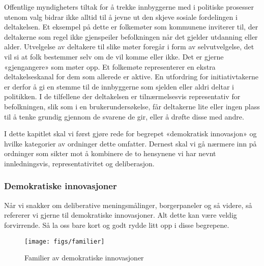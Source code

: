 \documentclass[
  12pt,
  a4paper, 12pt]{article}
\begin{document}
Offentlige myndigheters tiltak for å trekke innbyggerne med i politiske prosesser utenom valg bidrar ikke alltid til å jevne ut den skjeve sosiale fordelingen i deltakelsen. Et eksempel på dette er folkemøter som kommunene inviterer til, der deltakerne som regel ikke gjenspeiler befolkningen når det gjelder utdanning eller alder. Utvelgelse av deltakere til slike møter foregår i form av selvutvelgelse, det vil si at folk bestemmer selv om de vil komme eller ikke. Det er gjerne «gjengangere» som møter opp. Et folkemøte representerer en ekstra deltakelseskanal for dem som allerede er aktive. En utfordring for initiativtakerne er derfor å gi en stemme til de innbyggerne som sjelden eller aldri deltar i politikken. I de tilfellene der deltakelsen er tilnærmelsesvis representativ for befolkningen, slik som i en brukerundersøkelse, får deltakerne lite eller ingen plass til å tenke grundig gjennom de svarene de gir, eller å drøfte disse med andre.

I dette kapitlet skal vi først gjøre rede for begrepet «demokratisk innovasjon» og hvilke kategorier av ordninger dette omfatter. Dernest skal vi gå nærmere inn på ordninger som sikter mot å kombinere de to hensynene vi har nevnt innledningsvis, representativitet og deliberasjon.

\hypertarget{demokratiske-innovasjoner}{%
\subsubsection{Demokratiske innovasjoner}\label{demokratiske-innovasjoner}}

Når vi snakker om deliberative meningsmålinger, borgerpaneler og så videre, så refererer vi gjerne til demokratiske innovasjoner. Alt dette kan være veldig forvirrende. Så la oss bare kort og godt rydde litt opp i disse begrepene.

\begin{figure}

{\centering \texttt{[image: figs/familier]} 

}

\caption{Familier av demokratiske innovasjoner}\label{fig:unnamed-chunk-1}
\end{figure}
\end{document}
